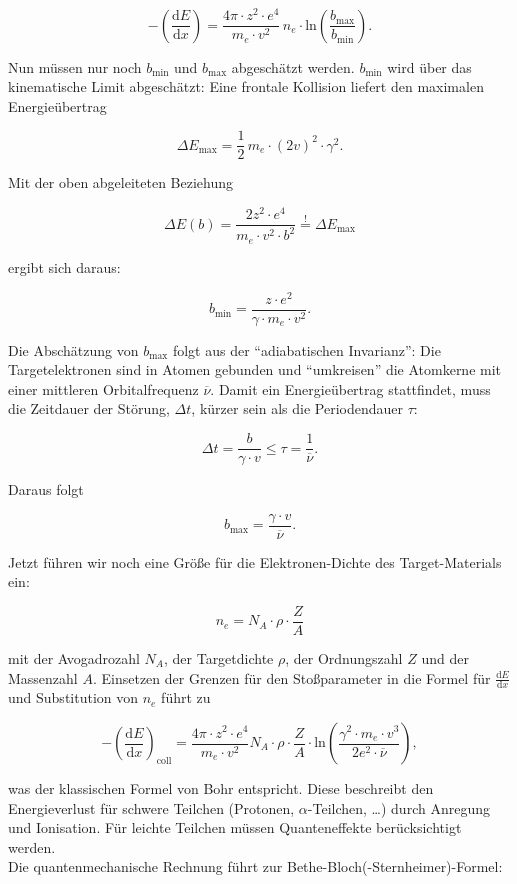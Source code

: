 \[-\left(\frac{\mathrm{d}E}{\mathrm{d}x}\right)=\frac{4\pi\cdot z^2\cdot 
e^4}{m_e\cdot v^2}\,n_e\cdot\text{ln}\left(\frac{b_{\text{max}}}{b_{\text{min}}}\right).\]

Nun müssen nur noch $b_{\text{min}}$ und $b_{\text{max}}$ abgeschätzt werden. $b_{\text{min}}$ wird
über das kinematische Limit abgeschätzt: Eine frontale Kollision liefert den maximalen Energieübertrag

\[\Delta E_{\text{max}}=\frac{1}{2}\,m_e\cdot(2v)^2\cdot\gamma^2.\]

Mit der oben abgeleiteten Beziehung

\[\Delta E(b)=\frac{2z^2\cdot e^4}{m_e\cdot v^2 \cdot b^2}\overset{!}{=}\Delta E_{\text{max}}\]

ergibt sich daraus:

\[b_{\text{min}}=\frac{z\cdot e^2}{\gamma\cdot m_e\cdot v^2}.\]

Die Abschätzung von $b_{\text{max}}$ folgt aus der "`adiabatischen Invarianz"': Die Targetelektronen
sind in Atomen gebunden und "`umkreisen"' die Atomkerne mit einer mittleren Orbitalfrequenz
$\overline{\nu}$. Damit ein Energieübertrag stattfindet, muss die Zeitdauer der Störung, $\Delta t$,
kürzer sein als die Periodendauer $\tau$:

\[\Delta t=\frac{b}{\gamma\cdot v} \le \tau =\frac{1}{\overline{\nu}}.\]

Daraus folgt

\[b_{\text{max}}=\frac{\gamma\cdot v}{\overline{\nu}}.\]

Jetzt führen wir noch eine Größe für die Elektronen-Dichte des Target-Materials ein:

\[n_e=N_A\cdot \rho\cdot \frac{Z}{A}\]

mit der Avogadrozahl $N_A$, der Targetdichte $\rho$, der Ordnungszahl $Z$ und der Massenzahl $A$.
Einsetzen der Grenzen für den Stoßparameter in die Formel für $\frac{\mathrm{d}E}{\mathrm{d}x}$ und
Substitution von $n_e$ führt zu

\[-\left(\frac{\mathrm{d}E}{\mathrm{d}x}\right)_{\text{coll}} = \frac{4\pi\cdot z^2\cdot e^4}{m_e\cdot v^2}N_A\cdot
\rho\cdot \frac{Z}{A}\cdot\text{ln}\left(\frac{\gamma^2\cdot m_e\cdot
v^3}{2e^2\cdot\overline{\nu}}\right), \]

was der klassischen Formel von Bohr entspricht. Diese beschreibt den Energieverlust für schwere
Teilchen (Protonen, $\alpha$-Teilchen, \ldots) durch Anregung und Ionisation. Für leichte Teilchen
müssen Quanteneffekte berücksichtigt werden.
\\
Die quantenmechanische Rechnung führt zur Bethe-Bloch(-Sternheimer)-Formel:

